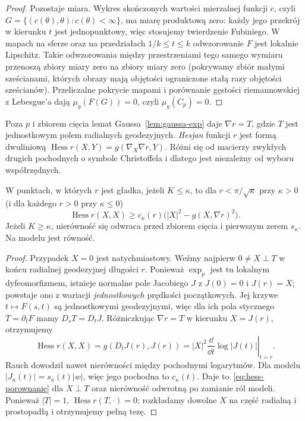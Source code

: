 \begin{proof}
Pozostaje miara. Wykres skończonych wartości mierzalnej
funkcji $c$, czyli $G=\{(c(\theta),\theta):c(\theta)<\infty\}$,
ma miarę produktową zero: każdy jego przekrój w kierunku
$t$ jest jednopunktowy, więc stosujemy twierdzenie Fubiniego.
W mapach na sferze oraz na przedziałach
$1/k\leq t\leq k$ odwzorowanie $F$ jest lokalnie Lipschitz.
Takie odwzorowania między przestrzeniami tego samego
wymiaru przenoszą zbiory miary zero na zbiory miary zero
(pokrywamy zbiór małymi sześcianami, których obrazy
mają objętości ograniczone stałą razy objętości sześcianów).
Przeliczalne pokrycie mapami i porównanie gęstości
riemannowskiej z Lebesgue'a dają $\mu_g(F(G))=0$,
czyli $\mu_g(C_p)=0$.
\end{proof}

Poza $p$ i zbiorem cięcia lemat
Gaussa~\ref{lem:gaussa-exp} daje
$\nabla r=T$, gdzie $T$ jest jednostkowym
polem radialnych geodezyjnych. \emph{Hesjan}
funkcji $r$ jest formą dwuliniową
$\operatorname{Hess}r(X,Y)=g(\nabla_X\nabla r,Y)$.
Różni się od macierzy zwykłych drugich pochodnych
o symbole Christoffela i dlatego jest
niezależny od wyboru współrzędnych.

\begin{wniosek}
\label{cor:hess-odleglosc-porownanie}
W punktach, w których $r$ jest gładka,
jeżeli $K\leq\kappa$, to dla
$r<\pi/\sqrt\kappa$ przy $\kappa>0$
(i dla każdego $r>0$ przy $\kappa\leq0$)
\begin{equation}\label{eq:hess-porownanie}
 \operatorname{Hess}r(X,X)
 \geq c_\kappa(r)
       \bigl(|X|^2-g(X,\nabla r)^2\bigr).
\end{equation}
Jeżeli $K\geq\kappa$, nierówność się odwraca
przed zbiorem cięcia i pierwszym zerem
$s_\kappa$. Na modelu jest równość.
\end{wniosek}
\begin{proof}
Przypadek $X=0$ jest natychmiastowy. Weźmy najpierw
$0\ne X\perp T$ w końcu radialnej
geodezyjnej długości $r$. Ponieważ $\exp_p$
jest tu lokalnym dyfeomorfizmem, istnieje
normalne pole Jacobiego $J$ z $J(0)=0$
i $J(r)=X$; powstaje ono z wariacji
\emph{jednostkowych} prędkości początkowych.
Jej krzywe $t\mapsto F(s,t)$ są jednostkowymi
geodezyjnymi, więc dla ich pola stycznego
$T=\partial_tF$ mamy $D_sT=D_tJ$.
Różniczkując $\nabla r=T$ w kierunku
$X=J(r)$, otrzymujemy
\begin{equation}\label{eq:hess-jacobi}
 \operatorname{Hess}r(X,X)
 =g(D_tJ(r),J(r))
 =|X|^2\left.\frac{\dd}{\dd t}
               \log|J(t)|\right|_{t=r}.
\end{equation}
Rauch dowodził nawet nierówności między
pochodnymi logarytmów. Dla modelu
$|J_{\kappa}(t)|=s_\kappa(t)|w|$,
więc jego pochodna to $c_\kappa(t)$.
Daje to~\eqref{eq:hess-porownanie}
dla $X\perp T$ oraz nierówność odwrotną
po zamianie ról modeli. Ponieważ $|T|=1$,
$\operatorname{Hess}r(T,\cdot)=0$;
rozkładamy dowolne $X$ na część radialną
i prostopadłą i otrzymujemy pełną tezę.
\end{proof}

